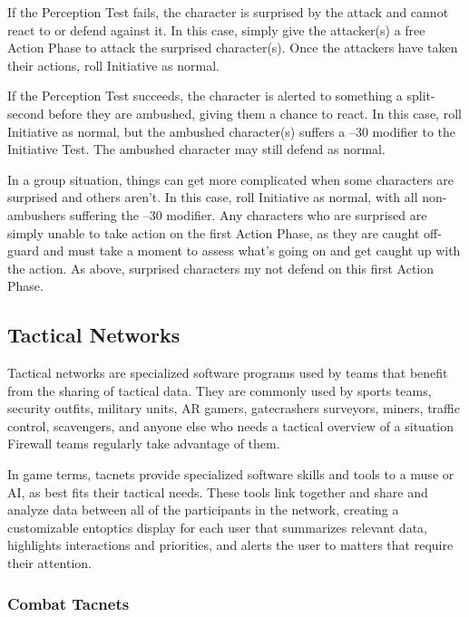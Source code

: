 If the Perception Test fails, the character is surprised 
by the attack and cannot react to or defend against it. In 
this case, simply give the attacker(s) a free Action Phase 
to attack the surprised character(s). Once the attackers 
have taken their actions, roll Initiative as normal.

If the Perception Test succeeds, the character is 
alerted to something a split-second before they are 
ambushed, giving them a chance to react. In this case, 
roll Initiative as normal, but the ambushed character(s) 
suffers a –30 modifier to the Initiative Test. The ambushed
character may still defend as normal.

In a group situation, things can get more complicated
when some characters are surprised and others
aren't. In this case, roll Initiative as normal, with all 
non-ambushers suffering the –30 modifier. Any characters
who are surprised are simply unable to take action
on the first Action Phase, as they are caught off-guard 
and must take a moment to assess what's going on 
and get caught up with the action. As above, surprised 
characters my not defend on this first Action Phase.

\subsection{Tactical Networks}

Tactical networks are specialized software programs  
used by teams that benefit from the sharing of tactical
data. They are commonly used by sports teams,
security outfits, military units, AR gamers, gatecrashers
surveyors, miners, traffic control, scavengers, and
anyone else who needs a tactical overview of a situation
Firewall teams regularly take advantage of them.

In game terms, tacnets provide specialized software 
skills and tools to a muse or AI, as best fits their tactical
needs. These tools link together and share and
analyze data between all of the participants in the 
network, creating a customizable entoptics display for 
each user that summarizes relevant data, highlights 
interactions and priorities, and alerts the user to matters
that require their attention.

\subsubsection{Combat Tacnets}

